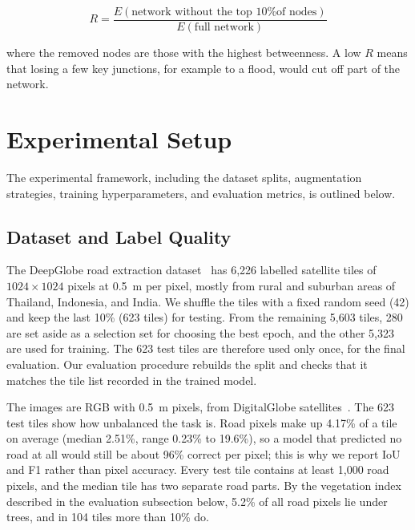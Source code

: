 \documentclass{ieeeaccess}
\begin{document}
\begin{equation}
R = \frac{E(\text{network without the top 10\% of nodes})}{E(\text{full network})}
\label{eq:resilience}
\end{equation}

where the removed nodes are those with the highest betweenness. A low $R$ means that losing a few key junctions, for example to a flood, would cut off part of the network.

\section{Experimental Setup}
\label{sec:setup}

The experimental framework, including the dataset splits, augmentation strategies, training hyperparameters, and evaluation metrics, is outlined below.

\subsection{Dataset and Label Quality}

The DeepGlobe road extraction dataset~\cite{demir2018deepglobe} has 6,226 labelled satellite tiles of $1024 \times 1024$ pixels at 0.5~m per pixel, mostly from rural and suburban areas of Thailand, Indonesia, and India. We shuffle the tiles with a fixed random seed (42) and keep the last 10\% (623 tiles) for testing. From the remaining 5,603 tiles, 280 are set aside as a selection set for choosing the best epoch, and the other 5,323 are used for training. The 623 test tiles are therefore used only once, for the final evaluation. Our evaluation procedure rebuilds the split and checks that it matches the tile list recorded in the trained model.

The images are RGB with 0.5~m pixels, from DigitalGlobe satellites~\cite{demir2018deepglobe}. The 623 test tiles show how unbalanced the task is. Road pixels make up 4.17\% of a tile on average (median 2.51\%, range 0.23\% to 19.6\%), so a model that predicted no road at all would still be about 96\% correct per pixel; this is why we report IoU and F1 rather than pixel accuracy. Every test tile contains at least 1,000 road pixels, and the median tile has two separate road parts. By the vegetation index described in the evaluation subsection below, 5.2\% of all road pixels lie under trees, and in 104 tiles more than 10\% do.
\end{document}
